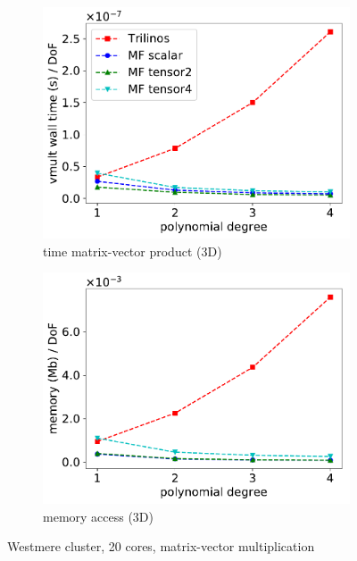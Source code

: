 \documentclass[AMA,STIX1COL]{WileyNJD-v2}
\begin{document}
\begin{figure}
\begin{subfigure}[b]{0.32\textwidth}
    \includegraphics[width=\textwidth]{IWR_newest_patched_timing3d.pdf}
    \caption{time matrix-vector product (3D)}
    \label{fig:benchmark_miehe_IWR_vmult3}
  \end{subfigure}
  \begin{subfigure}[b]{0.32\textwidth}
    \centering
    \includegraphics[width=\textwidth]{IWR_newest_patched_memory3d.pdf}
    \caption{memory access (3D)}
    \label{fig:benchmark_miehe_IWR_memory3}
  \end{subfigure}
  \caption{{\color{red}Westmere} cluster, 20 cores, matrix-vector multiplication}%
  \label{fig:benchmark_miehe_IWR}
\end{figure}
\end{document}
